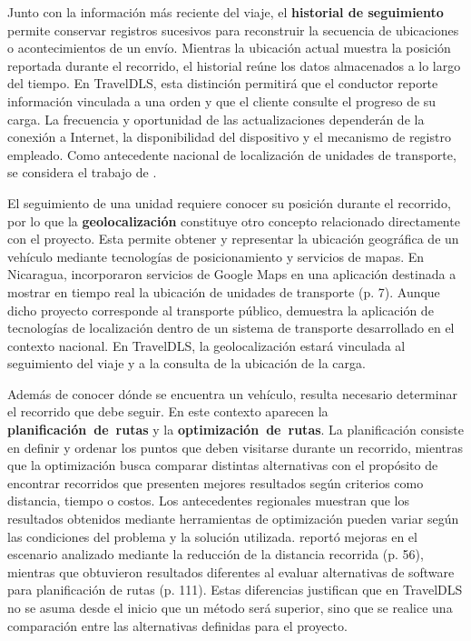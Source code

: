 Junto con la información más reciente del viaje, el \hypertarget{concepto-historial}{\textbf{historial de seguimiento}} permite conservar registros sucesivos para reconstruir la secuencia de ubicaciones o acontecimientos de un envío. Mientras la ubicación actual muestra la posición reportada durante el recorrido, el historial reúne los datos almacenados a lo largo del tiempo. En TravelDLS, esta distinción permitirá que el conductor reporte información vinculada a una orden y que el cliente consulte el progreso de su carga. La frecuencia y oportunidad de las actualizaciones dependerán de la conexión a Internet, la disponibilidad del dispositivo y el mecanismo de registro empleado. Como antecedente nacional de localización de unidades de transporte, se considera el trabajo de \textcite{garcia2022desarrollo}.

El seguimiento de una unidad requiere conocer su posición durante el recorrido, por lo que la \hypertarget{concepto-geolocalizacion}{\textbf{geolocalización}} constituye otro concepto relacionado directamente con el proyecto. Esta permite obtener y representar la ubicación geográfica de un vehículo mediante tecnologías de posicionamiento y servicios de mapas. En Nicaragua, \textcite{garcia2022desarrollo} incorporaron servicios de Google Maps en una aplicación destinada a mostrar en tiempo real la ubicación de unidades de transporte (p. 7). Aunque dicho proyecto corresponde al transporte público, demuestra la aplicación de tecnologías de localización dentro de un sistema de transporte desarrollado en el contexto nacional. En TravelDLS, la geolocalización estará vinculada al seguimiento del viaje y a la consulta de la ubicación de la carga.

Además de conocer dónde se encuentra un vehículo, resulta necesario determinar el recorrido que debe seguir. En este contexto aparecen la \hypertarget{concepto-planificacion-rutas}{\mbox{\textbf{planificación de rutas}}} y la \hypertarget{concepto-optimizacion-rutas}{\mbox{\textbf{optimización de rutas}}}. La planificación consiste en definir y ordenar los puntos que deben visitarse durante un recorrido, mientras que la optimización busca comparar distintas alternativas con el propósito de encontrar recorridos que presenten mejores resultados según criterios como distancia, tiempo o costos. Los antecedentes regionales muestran que los resultados obtenidos mediante herramientas de optimización pueden variar según las condiciones del problema y la solución utilizada. \textcite{aguilar2022optimizacion} reportó mejoras en el escenario analizado mediante la reducción de la distancia recorrida (p. 56), mientras que \textcite{hernandez2024evaluacion} obtuvieron resultados diferentes al evaluar alternativas de software para planificación de rutas (p. 111). Estas diferencias justifican que en TravelDLS no se asuma desde el inicio que un método será superior, sino que se realice una comparación entre las alternativas definidas para el proyecto.


